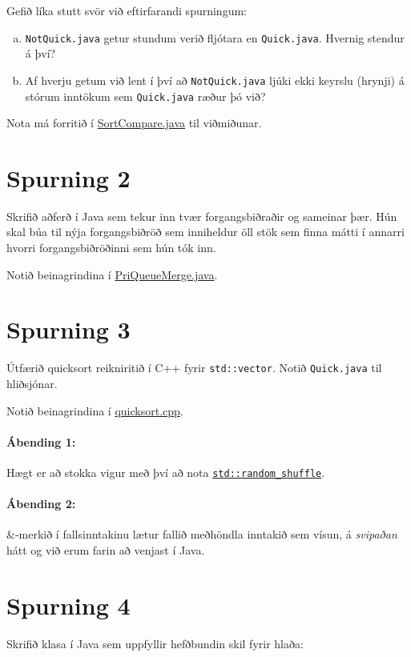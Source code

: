 \documentclass{article}
\begin{document}
Gefið líka stutt svör við eftirfarandi spurningum:

\begin{enumerate}[a)]
 \item \texttt{NotQuick.java} getur stundum verið fljótara en \texttt{Quick.java}. Hvernig stendur á því?
 \item Af hverju getum við lent í því að \texttt{NotQuick.java} ljúki ekki keyrslu (hrynji) á stórum inntökum sem \texttt{Quick.java} ræður þó við?
\end{enumerate}

Nota má forritið í \href{https://github.com/Ernir/kennsluefni/tree/master/T2/Code/w7/SortCompare.java}{SortCompare.java} til viðmiðunar.

\section{Spurning 2}
Skrifið aðferð í Java sem tekur inn tvær forgangsbiðraðir og sameinar þær. 
Hún skal búa til nýja forgangsbiðröð sem inniheldur öll stök sem finna mátti í annarri hvorri forgangsbiðröðinni sem hún tók inn.

Notið beinagrindina í \href{https://github.com/Ernir/kennsluefni/tree/master/T2/Code/w7/PriQueueMerge.java}{PriQueueMerge.java}.

\section{Spurning 3}
Útfærið quicksort reikniritið í C++ fyrir \texttt{std::vector}. Notið \texttt{Quick.java} til hliðsjónar.

Notið beinagrindina í \href{https://github.com/Ernir/kennsluefni/tree/master/T2/Code/w7/quicksort.cpp}{quicksort.cpp}.

\paragraph{Ábending 1:} Hægt er að stokka vigur með því að nota \href{http://www.cplusplus.com/reference/algorithm/random_shuffle/}{\texttt{std::random\_shuffle}}.
\paragraph{Ábending 2:} \&-merkið í fallsinntakinu lætur fallið meðhöndla inntakið sem vísun, á \emph{svipaðan} hátt og við erum farin að venjast í Java.

\section{Spurning 4}
Skrifið klasa í Java sem uppfyllir hefðbundin skil fyrir hlaða:
\end{document}
